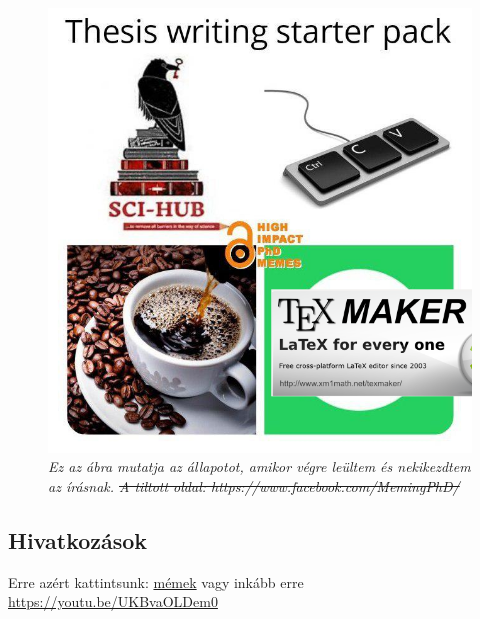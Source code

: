 \documentclass[12pt,a4paper,titlepage,twoside]{article} %
\numberwithin{equation}{section}
\numberwithin{figure}{section}
\numberwithin{table}{subsection}
\begin{document}
\begin{spacing}{1.5}
\begin{figure}[!hbt]
	\begin{center}
		\includegraphics[scale=0.5]{figs/72876529_2457717027805946_1450758038972530688_n.png}
	\end{center}
	\caption{\textit{Ez az ábra mutatja az állapotot, amikor végre leültem és nekikezdtem \cite{brewster} az írásnak. \st{A tiltott oldal: https://www.facebook.com/MemingPhD/}}}
	\label{fig:starterpack}
\end{figure}

\lipsum[1-7]

\subsection{Hivatkozások}

Erre azért kattintsunk: \href{https://www.facebook.com/MemingPhD/}{mémek} vagy inkább erre \url{https://youtu.be/UKBvaOLDem0}


\end{spacing}
\end{document}
